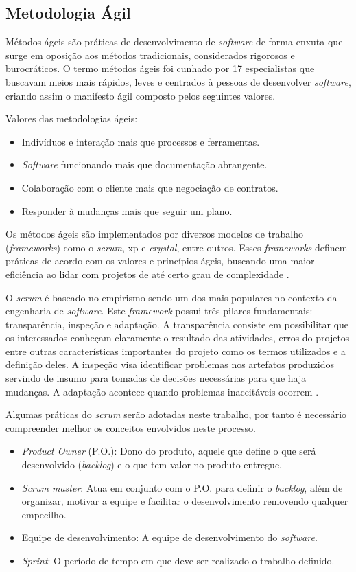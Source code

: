 \subsection{Metodologia Ágil}

Métodos ágeis são práticas de desenvolvimento de \textit{software} de forma enxuta que surge em oposição aos métodos tradicionais, considerados rigorosos e burocráticos. O termo métodos ágeis foi cunhado por 17 especialistas que buscavam meios mais rápidos, leves e centrados à pessoas de desenvolver \textit{software}, criando assim o manifesto ágil composto pelos seguintes valores.

Valores das metodologias ágeis:
\begin{itemize}
	\item Indivíduos e interação mais que processos e ferramentas.
	\item \textit{Software} funcionando mais que documentação abrangente.
	\item Colaboração com o cliente mais que negociação de contratos.
	\item Responder à mudanças mais que seguir um plano.
\end{itemize}

Os métodos ágeis são implementados por diversos modelos de trabalho (\textit{frameworks}) como o \textit{scrum}, xp e \textit{crystal}, entre outros. Esses \textit{frameworks} definem práticas de acordo com os valores e princípios ágeis, buscando uma maior eficiência ao lidar com projetos de até certo grau de complexidade \cite{prik2014}.

O \textit{scrum} é baseado no empirismo sendo um dos mais populares no contexto da engenharia de \textit{software}. Este \textit{framework} possui três pilares fundamentais: transparência, inspeção e adaptação. A transparência consiste em possibilitar que os interessados conheçam claramente o resultado das atividades, erros do projetos entre outras características importantes do projeto como os termos utilizados e a definição deles. A inspeção visa identificar problemas nos artefatos produzidos servindo de insumo para tomadas de decisões necessárias para que haja mudanças. A adaptação acontece quando problemas inaceitáveis ocorrem \cite{scrum2014}.

Algumas práticas do \textit{scrum} serão adotadas neste trabalho, por tanto é necessário compreender melhor os conceitos envolvidos neste processo.

\begin{itemize}
	\item \textit{Product Owner} (P.O.): Dono do produto, aquele que define o que será desenvolvido (\textit{backlog}) e o que tem valor no produto entregue.
	\item \textit{Scrum master}: Atua em conjunto com o P.O. para definir o \textit{backlog}, além de organizar, motivar a equipe e facilitar o desenvolvimento removendo qualquer empecilho.
	\item Equipe de desenvolvimento: A equipe de desenvolvimento do \textit{software}.
	\item \textit{Sprint}: O período de tempo em que deve ser realizado o trabalho definido.
\end{itemize}

